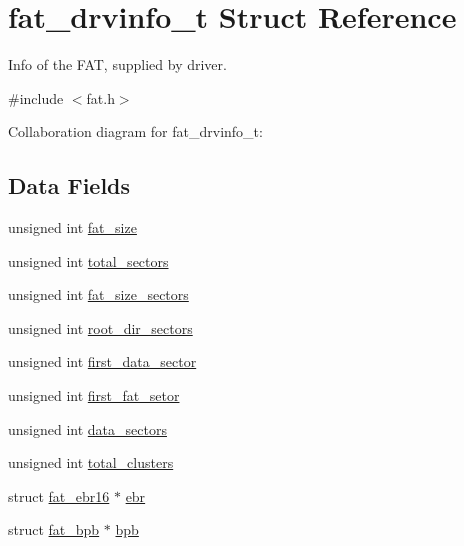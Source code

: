 \hypertarget{a00065}{}\section{fat\+\_\+drvinfo\+\_\+t Struct Reference}
\label{a00065}


Info of the F\+AT, supplied by driver.  




{\ttfamily \#include $<$fat.\+h$>$}



Collaboration diagram for fat\+\_\+drvinfo\+\_\+t\+:
\subsection*{Data Fields}
\begin{DoxyCompactItemize}
\item 
unsigned int \hyperlink{a00065_a1117076f96b9abe596cc88d060d54bb5_a1117076f96b9abe596cc88d060d54bb5}{fat\+\_\+size}
\item 
unsigned int \hyperlink{a00065_a47d5e31a3e5c6c314f49705a3961f7ea_a47d5e31a3e5c6c314f49705a3961f7ea}{total\+\_\+sectors}
\item 
unsigned int \hyperlink{a00065_a5914068d456ec39d658f9a6abfda2e53_a5914068d456ec39d658f9a6abfda2e53}{fat\+\_\+size\+\_\+sectors}
\item 
unsigned int \hyperlink{a00065_a6d1012bf1bf24392f0a6ce9135061769_a6d1012bf1bf24392f0a6ce9135061769}{root\+\_\+dir\+\_\+sectors}
\item 
unsigned int \hyperlink{a00065_aa699654d6c24b989c4e883d39adf2c30_aa699654d6c24b989c4e883d39adf2c30}{first\+\_\+data\+\_\+sector}
\item 
unsigned int \hyperlink{a00065_a69cc724ff65e1ebbf8321e29ea7a9da9_a69cc724ff65e1ebbf8321e29ea7a9da9}{first\+\_\+fat\+\_\+setor}
\item 
unsigned int \hyperlink{a00065_a25e043cab40af89e54687fa100b1abf1_a25e043cab40af89e54687fa100b1abf1}{data\+\_\+sectors}
\item 
unsigned int \hyperlink{a00065_af935fed26cf392e9e8149d5feb511e8d_af935fed26cf392e9e8149d5feb511e8d}{total\+\_\+clusters}
\item 
struct \hyperlink{a00057}{fat\+\_\+ebr16} $\ast$ \hyperlink{a00065_a825f02713bdb8c993368eaf7857eff16_a825f02713bdb8c993368eaf7857eff16}{ebr}
\item 
struct \hyperlink{a00053}{fat\+\_\+bpb} $\ast$ \hyperlink{a00065_a5596cc2d01bcd3405718bee044412332_a5596cc2d01bcd3405718bee044412332}{bpb}
\end{DoxyCompactItemize}


